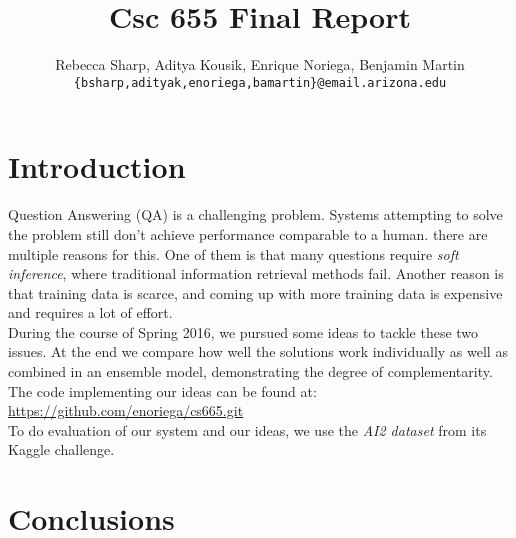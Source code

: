 \documentclass[11pt]{article}
\title{Csc 655 Final Report}
\author{Rebecca Sharp, Aditya Kousik, Enrique Noriega, Benjamin Martin\\
  {\tt \{bsharp,adityak,enoriega,bamartin\}@email.arizona.edu} \\}
\date{}
\begin{document}
\maketitle
\begin{abstract}
  
\end{abstract}

\section{Introduction}

Question Answering (QA) is a challenging problem. Systems attempting to solve the problem still don't achieve performance comparable to a human. there are multiple reasons for this. One of them is that many questions require \emph{soft inference}, where traditional information retrieval methods fail. Another reason is that training data is scarce, and coming up with more training data is expensive and requires a lot of effort. \\

During the course of Spring 2016, we pursued some ideas to tackle these two issues. At the end we compare how well the solutions work individually as well as combined in an ensemble model, demonstrating the degree of complementarity. The code implementing our ideas can be found at:\\ 
\url{https://github.com/enoriega/cs665.git}\\

To do evaluation of our system and our ideas, we use the \emph{AI2 dataset} from its Kaggle challenge.








\section{Conclusions}

%
%
\end{document}
